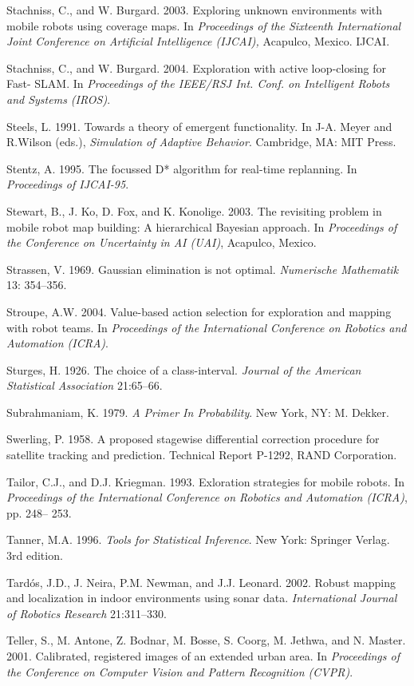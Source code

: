 \documentclass[10pt,a4paper]{article}
\begin{document}
Stachniss, C., and W. Burgard. 2003. Exploring unknown environments with mobile
robots using coverage maps. In \textit{Proceedings of the Sixteenth International Joint
Conference on Artificial Intelligence (IJCAI),} Acapulco, Mexico. IJCAI.

Stachniss, C., and W. Burgard. 2004. Exploration with active loop-closing for Fast-
SLAM. In \textit{Proceedings of the IEEE/RSJ Int. Conf. on Intelligent Robots and Systems
(IROS)}.

Steels, L. 1991. Towards a theory of emergent functionality. In J-A. Meyer and R.Wilson
(eds.), \textit{Simulation of Adaptive Behavior}. Cambridge, MA: MIT Press.

Stentz, A. 1995. The focussed D* algorithm for real-time replanning. In \textit{Proceedings of
IJCAI-95}.

Stewart, B., J. Ko, D. Fox, and K. Konolige. 2003. The revisiting problem in mobile
robot map building: A hierarchical Bayesian approach. In \textit{Proceedings of the
Conference on Uncertainty in AI (UAI)}, Acapulco, Mexico.

Strassen, V. 1969. Gaussian elimination is not optimal. \textit{Numerische Mathematik} 13:
354–356.

Stroupe, A.W. 2004. Value-based action selection for exploration and mapping with
robot teams. In \textit{Proceedings of the International Conference on Robotics and Automation
(ICRA)}.

Sturges, H. 1926. The choice of a class-interval. \textit{Journal of the American Statistical
Association} 21:65–66.

Subrahmaniam, K. 1979. \textit{A Primer In Probability}. New York, NY: M. Dekker.

Swerling, P. 1958. A proposed stagewise differential correction procedure for satellite
tracking and prediction. Technical Report P-1292, RAND Corporation.

Tailor, C.J., and D.J. Kriegman. 1993. Exloration strategies for mobile robots. In
\textit{Proceedings of the International Conference on Robotics and Automation (ICRA)}, pp. 248–
253.

Tanner, M.A. 1996. \textit{Tools for Statistical Inference}. New York: Springer Verlag. 3rd
edition.

Tardós, J.D., J. Neira, P.M. Newman, and J.J. Leonard. 2002. Robust mapping and localization
in indoor environments using sonar data. \textit{International Journal of Robotics
Research} 21:311–330.

Teller, S., M. Antone, Z. Bodnar, M. Bosse, S. Coorg, M. Jethwa, and N. Master. 2001.
Calibrated, registered images of an extended urban area. In \textit{Proceedings of the Conference
on Computer Vision and Pattern Recognition (CVPR)}.
\end{document}
